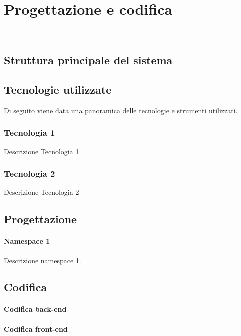 \chapter{Progettazione e codifica}
\label{cap:progettazione-codifica}

\\

\section{Struttura principale del sistema}

\section{Tecnologie utilizzate}
\label{sec:tecnologie-strumenti}

Di seguito viene data una panoramica delle tecnologie e strumenti utilizzati.

\subsection*{Tecnologia 1}
Descrizione Tecnologia 1.

\subsection*{Tecnologia 2}
Descrizione Tecnologia 2

\section{Progettazione}
\label{sec:progettazione}

\subsubsection{Namespace 1} %
Descrizione namespace 1.

\begin{namespacedesc}
\end{namespacedesc}


\section{Codifica}
\subsubsection{Codifica back-end} 
\subsubsection{Codifica front-end} 


